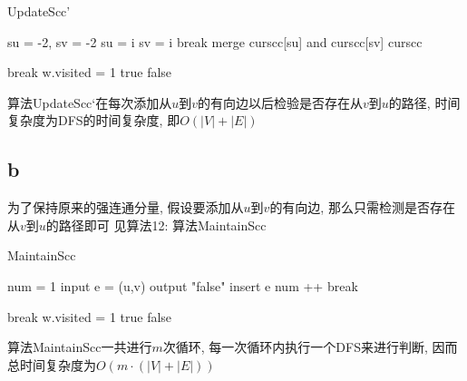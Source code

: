 \documentclass{article}
\begin{document}
\begin{algorithm}
\caption{UpdateScc’}
\begin{algorithmic}[1]
\State su = -2, sv = -2
\State su = i
\EndIf
{}
\State sv = i
\EndIf
{}
\State break
\EndIf
\EndFor
\State merge curscc[su] and curscc[sv]
\EndIf
\State \Return curscc
\EndProcedure

\State break
\EndIf
\State w.visited = 1
\State \Return true
\EndIf
\State {}
\EndFor
\State \Return false
\EndProcedure
\end{algorithmic}
\end{algorithm}

算法UpdateScc‘在每次添加从$u$到$v$的有向边以后检验是否存在从$v$到$u$的路径, 时间复杂度为DFS的时间复杂度, 即$O(|V|+|E|)$
\subsection{b}
为了保持原来的强连通分量, 假设要添加从$u$到$v$的有向边, 那么只需检测是否存在从$v$到$u$的路径即可
见算法12: 算法MaintainScc

\begin{algorithm}
\caption{MaintainScc}
\begin{algorithmic}[1]
\State num = 1
\State input e = (u,v)
\State output "false" 
\Else
\State insert e
\State num ++
\EndIf
{}
\State break
\EndIf
\EndWhile
\EndProcedure

\State break
\EndIf
\State w.visited = 1
\State \Return true
\EndIf
\State {}
\EndFor
\State \Return false
\EndProcedure
\end{algorithmic}
\end{algorithm}

算法MaintainScc一共进行$m$次循环, 每一次循环内执行一个DFS来进行判断, 因而总时间复杂度为$O(m \cdot (|V|+|E|))$

 
\end{document}
